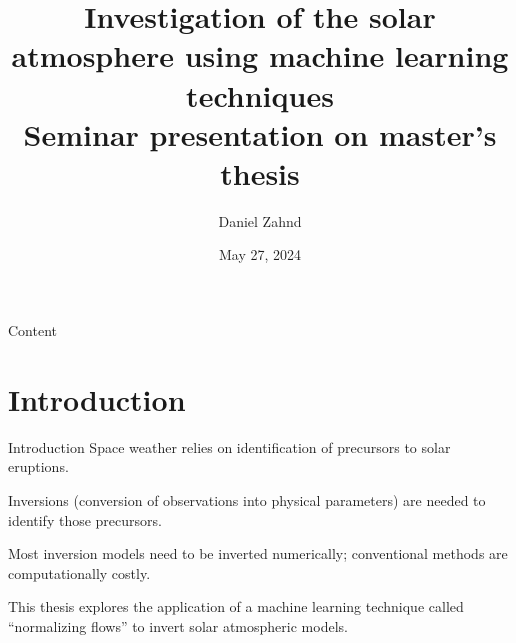 \documentclass{beamer}
\title{Investigation of the solar atmosphere using machine learning techniques \\ \vspace{0.4cm} \small Seminar presentation on master's thesis}
\author{Daniel Zahnd}
\date{May 27, 2024}
\begin{document}
\begin{frame}
\maketitle
\end{frame}
\setcounter{framenumber}{0}

\setlength{\parskip}{2pt}
\begin{frame}{Content}
\tableofcontents
\end{frame}
\setlength{\parskip}{8pt}
\section{Introduction}
\begin{frame}[allowframebreaks]{Introduction}
Space weather relies on identification of precursors to solar eruptions.

Inversions (conversion of observations into physical parameters) are needed to identify those precursors.

Most inversion models need to be inverted numerically; conventional methods are computationally costly.

This thesis explores the application of a machine learning technique called ``normalizing flows'' to invert solar atmospheric models.
\end{frame}
\end{document}

